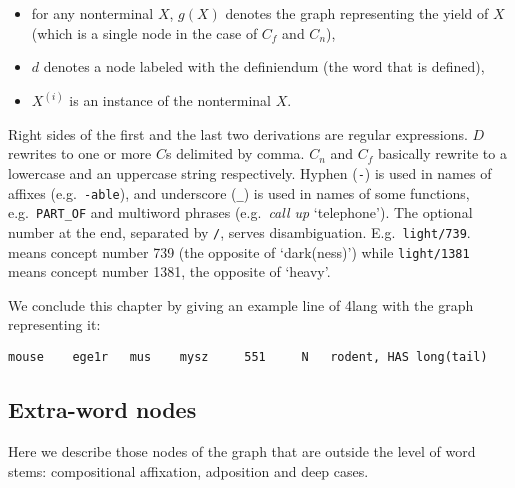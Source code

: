\documentclass[a4paper,10pt]{article}
\begin{document}
\begin{itemize}
 \item for any nonterminal $X$, $g(X)$ denotes the graph representing the yield of $X$ (which is a single node in the case of $C_f$ and $C_n$),
 \item $d$ denotes a node labeled with the definiendum (the word that is defined),
 \item $X^{(i)}$ is an instance of the nonterminal $X$.
\end{itemize} 
Right sides of the first and the last two derivations are regular expressions.
$D$ rewrites to one or more $C$s delimited by comma.  $C_n$ and $C_f$
basically rewrite to a lowercase and an uppercase string respectively. Hyphen
(\texttt{-}) is used in names of affixes (e.g.\ \texttt{-able}), and
underscore (\texttt{\_}) is used in names of some functions, e.g.\
\texttt{PART\_OF} and multiword phrases (e.g.\ \emph{call up} `telephone').
The optional number at the end, separated by \texttt{/}, serves
disambiguation. E.g.\ \texttt{light/739}.  means concept number 739 (the
opposite of `dark(ness)') while \texttt{light/1381} means concept number 1381,
the opposite of `heavy'.

We conclude this chapter by giving an example line of 4lang with the graph
representing it:

\begin{verbatim}
mouse	 ege1r	 mus	mysz	 551	 N	 rodent, HAS long(tail)
\end{verbatim}
\subsection{Extra-word nodes}\label{sec_extraword}
Here we describe those nodes of the graph that are outside the level of word
stems: compositional affixation, adposition and deep cases.%
\end{document}
